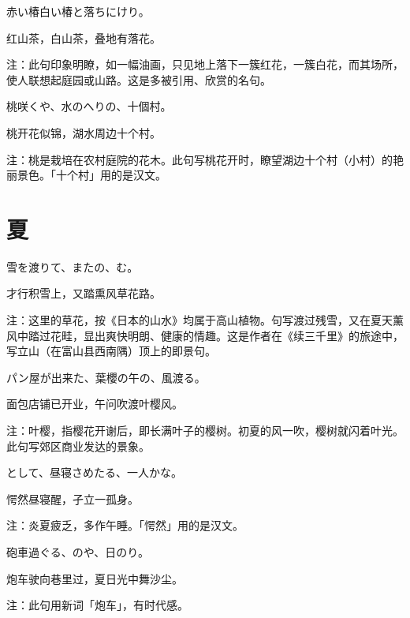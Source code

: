 \begin{haiku}
    {\FH 赤い椿白い椿と落ちにけり。}

    {\FK 红山茶，白山茶，叠地有落花。}

    {\FT 注：此句印象明瞭，如一幅油画，只见地上落下一簇红花，一簇白花，而其场所，使人联想起庭园或山路。这是多被引用、欣赏的名句。}
\end{haiku}

\begin{haiku}
    {\FH 桃咲くや、水のへりの、十個村。}

    {\FK 桃开花似锦，湖水周边十个村。}

    {\FT 注：桃是栽培在农村庭院的花木。此句写桃花开时，瞭望湖边十个村（小村）的艳丽景色。「十个村」用的是汉文。}
\end{haiku}

\section{\FK 夏}

\setcounter{haikucounter}{0}

\begin{haiku}
    {\FH 雪を渡りて、またの、む。}

    {\FK 才行积雪上，又踏熏风草花路。}

    {\FT 注：这里的草花，按《日本的山水》均属于高山植物。句写渡过残雪，又在夏天薰风中踏过花畦，显出爽快明朗、健康的情趣。这是作者在《续三千里》的旅途中，写立山（在富山县西南隅）顶上的即景句。}
\end{haiku}

\begin{haiku}
    {\FH パン屋が出来た、葉櫻の午の、風渡る。}

    {\FK 面包店铺已开业，午问吹渡叶樱风。}

    {\FT 注：叶樱，指樱花开谢后，即长满叶子的樱树。初夏的风一吹，樱树就闪着叶光。此句写郊区商业发达的景象。}
\end{haiku}

\begin{haiku}
    {\FH {}として、昼寝さめたる、一人かな。}

    {\FK 愕然昼寝醒，孑立一孤身。}

    {\FT 注：炎夏疲乏，多作午睡。「愕然」用的是汉文。}
\end{haiku}

\begin{haiku}
    {\FH 砲車過ぐる、のや、日のり。}

    {\FK 炮车驶向巷里过，夏日光中舞沙尘。}

    {\FT 注：此句用新词「炮车」，有时代感。}
\end{haiku}

